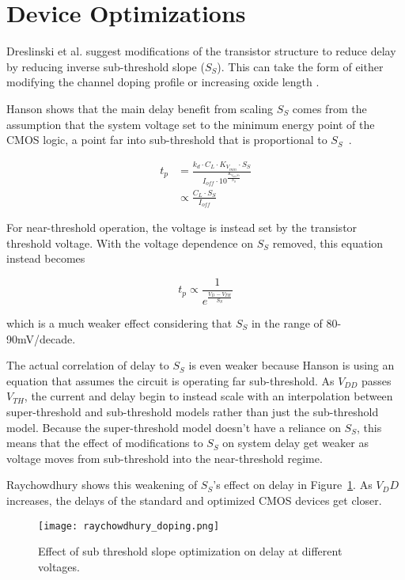 \section{Device Optimizations}
\label{sec:deviceoptimization}

Dreslinski et al. \cite{Dreslinski:2010ez} suggest modifications of the transistor structure to reduce delay by reducing inverse sub-threshold slope ($S_S$). 
This can take the form of either modifying the channel doping profile \cite{Paul:2004cx} or increasing oxide length \cite{Hanson:2007uu}.

Hanson shows that the main delay benefit from scaling $S_S$ comes from the assumption that the system voltage set to the minimum energy point of the CMOS logic, a point far into sub-threshold that is proportional to $S_S$~\cite{Hanson:2007uu}. 

\begin{align}
t_p&=\frac{k_d \cdot C_L \cdot K_{V_{min}} \cdot S_S}{I_{off} \cdot 10^\frac{K_{V_{min}S_S}}{S_S}}\\
&\propto \frac{C_L \cdot S_S}{I_{off}}
\end{align}

For near-threshold operation, the voltage is instead set by the transistor threshold voltage. 
With the voltage dependence on $S_S$ removed, this equation instead becomes

\begin{equation}
t_p \propto \frac{1}{e^\frac{V_{D}-V_{TH}}{S_S}}
\end{equation} 

which is a much weaker effect considering that $S_S$ in the range of 80-90mV/decade. 

The actual correlation of delay to $S_S$ is even weaker because Hanson is using an equation that assumes the circuit is operating far sub-threshold. 
As $V_{DD}$ passes $V_{TH}$, the current and delay begin to instead scale with an interpolation between super-threshold and sub-threshold models rather than just the sub-threshold model. 
Because the super-threshold model doesn't have a reliance on $S_S$, this means that the effect of modifications to $S_S$ on system delay get weaker as voltage moves from sub-threshold into the near-threshold regime.

 Raychowdhury \cite{Raychowdhury:2006fu} shows this weakening of $S_S$'s effect on delay in Figure~\ref{fig:doping}. As $V_DD$ increases, the delays of the standard and optimized CMOS devices get closer.
  
\begin{figure}[thpb]
    \centering
    \texttt{[image: raychowdhury\_doping.png]}
    \caption{Effect of sub threshold slope optimization on delay at different voltages.~\cite{Raychowdhury:2006fu}}
    \label{fig:doping}
\end{figure}
 
